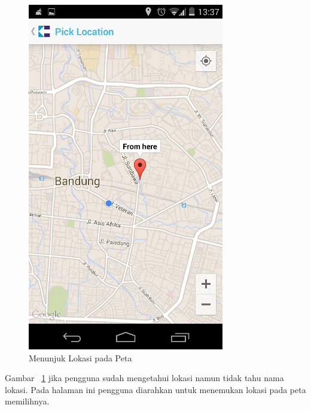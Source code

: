 \begin{figure}[h]
	\centering
		\includegraphics[scale=0.5]{Gambar/KIRI_Android/menunjuk_lokasi}
	\caption{Menunjuk Lokasi pada Peta}
	\label{fig:menunjuk}
\end{figure}

Gambar ~\ref{fig:menunjuk} jika pengguna sudah mengetahui lokasi namun tidak tahu nama lokasi. Pada halaman ini pengguna diarahkan untuk menemukan lokasi pada peta memilihnya.

